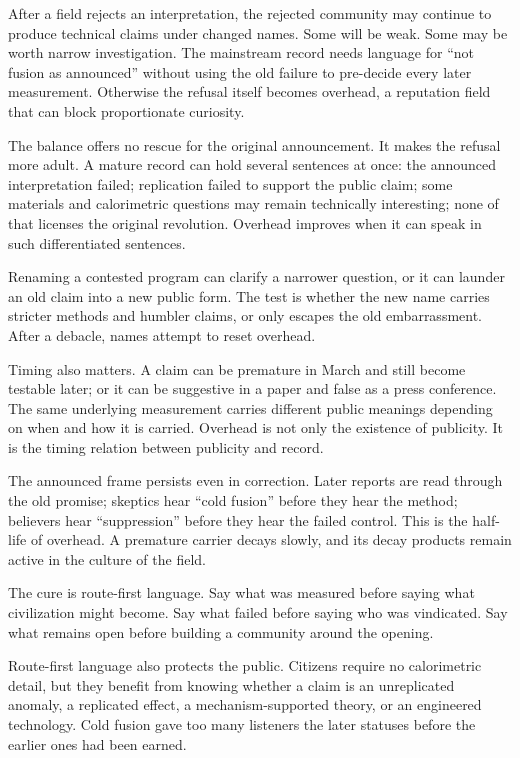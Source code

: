 After a field rejects an interpretation, the rejected community may
continue to produce technical claims under changed names. Some will be
weak. Some may be worth narrow investigation. The mainstream record needs
language for ``not fusion as announced'' without using the old failure to
pre-decide every later measurement. Otherwise the refusal itself becomes
overhead, a reputation field that can block proportionate curiosity.

The balance offers no rescue for the original announcement. It makes the
refusal more adult. A mature record can hold several sentences at once:
the announced interpretation failed; replication failed to support the
public claim; some materials and calorimetric questions may remain
technically interesting; none of that licenses the original revolution.
Overhead improves when it can speak in such differentiated sentences.

Renaming a contested program can clarify a narrower question, or it can
launder an old claim into a new public form. The test is whether the new
name carries stricter methods and humbler claims, or only escapes the old
embarrassment. After a debacle, names attempt to reset overhead.

Timing also matters. A claim can be premature in March and still become
testable later; or it can be suggestive in a paper and false
as a press conference. The same underlying measurement carries different
public meanings depending on when and how it is carried. Overhead is not
only the existence of publicity. It is the timing relation between
publicity and record.

The announced frame persists even in correction. Later reports are read
through the old promise; skeptics hear ``cold fusion'' before they hear
the method; believers hear ``suppression'' before they hear the failed
control. This is the half-life of overhead. A premature carrier decays
slowly, and its decay products remain active in the culture of the
field.

The cure is route-first language. Say what was measured before saying
what civilization might become. Say what failed before saying who was
vindicated. Say what remains open before building a community around the
opening.

Route-first language also protects the public. Citizens require no
calorimetric detail, but they benefit from knowing whether a claim is an
unreplicated anomaly, a replicated effect, a mechanism-supported theory,
or an engineered technology. Cold fusion gave too many listeners the
later statuses before the earlier ones had been earned.

